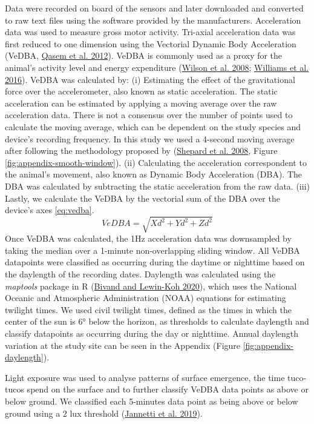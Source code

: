\documentclass[english,msc,numbers,hidelinks]{coppe}
\begin{document}
  Data were recorded on board of the sensors and later downloaded and converted to raw text files using the software provided by the manufacturers. Acceleration data was used to measure gross motor activity. Tri-axial acceleration data was first reduced to one dimension using the Vectorial Dynamic Body Acceleration (VeDBA, \protect\hyperlink{ref-qasem2012}{Qasem et al. 2012}). VeDBA is commonly used as a proxy for the animal's activity level and energy expenditure (\protect\hyperlink{ref-wilson2008}{Wilson et al. 2008}; \protect\hyperlink{ref-williams2016}{Williams et al. 2016}). VeDBA was calculated by: (i) Estimating the effect of the gravitational force over the accelerometer, also known as static acceleration. The static acceleration can be estimated by applying a moving average over the raw acceleration data. There is not a consensus over the number of points used to calculate the moving average, which can be dependent on the study species and device's recording frequency. In this study we used a 4-second moving average after following the methodology proposed by (\protect\hyperlink{ref-shepard2008}{Shepard et al. 2008}, Figure \ref{fig:appendix-smooth-window}). (ii) Calculating the acceleration correspondent to the animal's movement, also known as Dynamic Body Acceleration (DBA). The DBA was calculated by subtracting the static acceleration from the raw data. (iii) Lastly, we calculate the VeDBA by the vectorial sum of the DBA over the device's axes \eqref{eq:vedba}.
  \begin{equation}
  VeDBA = \sqrt{Xd^2 + Yd^2 + Zd^2} \label{eq:vedba}
  \end{equation}
  Once VeDBA was calculated, the 1Hz acceleration data was downsampled by taking the median over a 1-minute non-overlapping sliding window. All VeDBA datapoints were classified as occurring during the daytime or nighttime based on the daylength of the recording dates. Daylength was calculated using the \emph{maptools} package in R (\protect\hyperlink{ref-bivand2020}{Bivand and Lewin-Koh 2020}), which uses the National Oceanic and Atmospheric Administration (NOAA) equations for estimating twilight times. We used civil twilight times, defined as the times in which the center of the sun is 6° below the horizon, as thresholds to calculate daylength and classify datapoints as occurring during the day or nighttime. Annual daylength variation at the study site can be seen in the Appendix (Figure \ref{fig:appendix-daylength}).

  Light exposure was used to analyse patterns of surface emergence, the time tuco-tucos spend on the surface and to further classify VeDBA data points as above or below ground. We classified each 5-minutes data point as being above or below ground using a 2 lux threshold (\protect\hyperlink{ref-jannetti2019}{Jannetti et al. 2019}).
\end{document}
